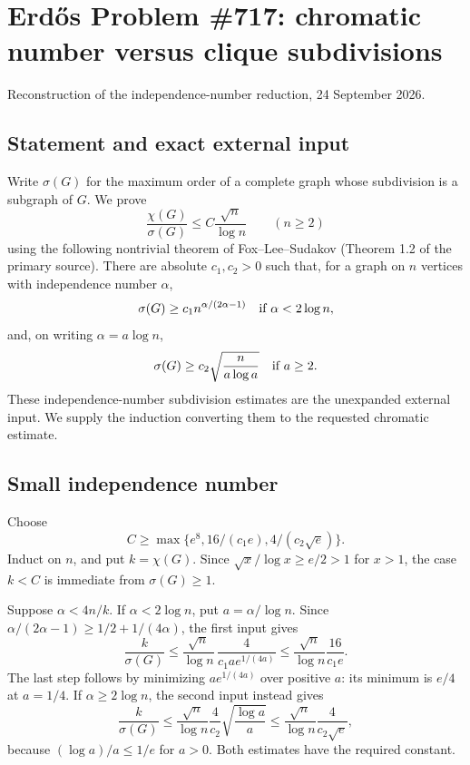 \section{Erd\H{o}s Problem \#717: chromatic number versus clique subdivisions}
\noindent Reconstruction of the independence-number reduction, 24 September 2026.

\subsection*{Statement and exact external input}
Write $\sigma(G)$ for the maximum order of a complete graph whose subdivision is a subgraph of $G$. We prove
\[
 \frac{\chi(G)}{\sigma(G)}\leq C\frac{\sqrt n}{\log n}\qquad(n\geq2)
\]
using the following nontrivial theorem of Fox--Lee--Sudakov (Theorem 1.2 of the primary source). There are absolute $c_1,c_2>0$ such that, for a graph on $n$ vertices with independence number $\alpha$,
\[
 \sigma(G)\geq c_1n^{\alpha/(2\alpha-1)}
       \quad\hbox{if }\alpha<2\log n,
\]
and, on writing $\alpha=a\log n$,
\[
 \sigma(G)\geq c_2\sqrt{\frac n{a\log a}}
       \quad\hbox{if }a\geq2.
\]
These independence-number subdivision estimates are the unexpanded external input. We supply the induction converting them to the requested chromatic estimate.

\subsection*{Small independence number}
Choose
\[
 C\geq\max\{e^8,16/(c_1e),4/(c_2\sqrt e)\}.
\]
Induct on $n$, and put $k=\chi(G)$. Since $\sqrt x/\log x\geq e/2>1$ for $x>1$, the case $k<C$ is immediate from $\sigma(G)\geq1$.

Suppose $\alpha<4n/k$. If $\alpha<2\log n$, put $a=\alpha/\log n$. Since $\alpha/(2\alpha-1)\geq1/2+1/(4\alpha)$, the first input gives
\[
 \frac{k}{\sigma(G)}
 \leq\frac{\sqrt n}{\log n}\,
       \frac4{c_1a e^{1/(4a)}}
 \leq\frac{\sqrt n}{\log n}\frac{16}{c_1e}.
\]
The last step follows by minimizing $a e^{1/(4a)}$ over positive $a$: its minimum is $e/4$ at $a=1/4$.
If $\alpha\geq2\log n$, the second input instead gives
\[
 \frac{k}{\sigma(G)}
 \leq\frac{\sqrt n}{\log n}\frac4{c_2}
          \sqrt{\frac{\log a}{a}}
 \leq\frac{\sqrt n}{\log n}\frac4{c_2\sqrt e},
\]
because $(\log a)/a\leq1/e$ for $a>0$. Both estimates have the required constant.

